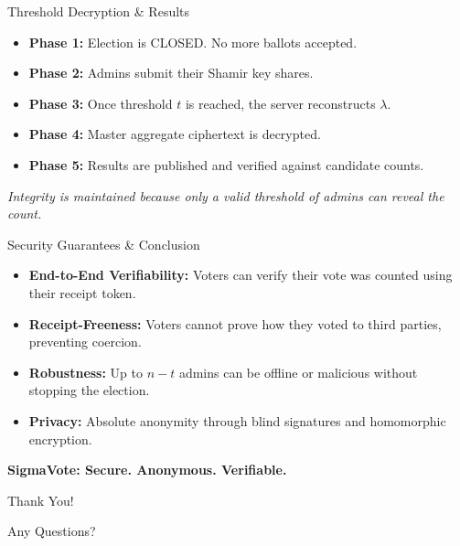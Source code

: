 \documentclass{beamer}
\begin{document}
\begin{frame}{Threshold Decryption \& Results}
    \begin{itemize}
        \item \textbf{Phase 1:} Election is CLOSED. No more ballots accepted.
        \item \textbf{Phase 2:} Admins submit their Shamir key shares.
        \item \textbf{Phase 3:} Once threshold $t$ is reached, the server reconstructs $\lambda$.
        \item \textbf{Phase 4:} Master aggregate ciphertext is decrypted.
        \item \textbf{Phase 5:} Results are published and verified against candidate counts.
    \end{itemize}
    \centering \textit{Integrity is maintained because only a valid threshold of admins can reveal the count.}
\end{frame}

\begin{frame}{Security Guarantees \& Conclusion}
    \begin{itemize}
        \item \textbf{End-to-End Verifiability:} Voters can verify their vote was counted using their receipt token.
        \item \textbf{Receipt-Freeness:} Voters cannot prove how they voted to third parties, preventing coercion.
        \item \textbf{Robustness:} Up to $n-t$ admins can be offline or malicious without stopping the election.
        \item \textbf{Privacy:} Absolute anonymity through blind signatures and homomorphic encryption.
    \end{itemize}
    \vspace{1cm}
    \centering \Large \textbf{SigmaVote: Secure. Anonymous. Verifiable.}
\end{frame}

\begin{frame}
    \vspace{2cm}
    \centering
    \Huge Thank You!
    
    \vspace{1cm}
    \large Any Questions?
\end{frame}
\end{document}
